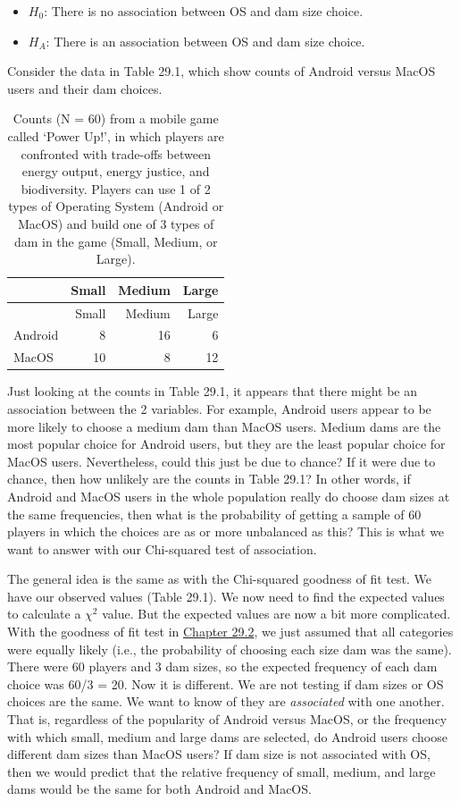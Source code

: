 \documentclass[
  openany]{scrbook}
\providecommand{\tightlist}{%
  \setlength{\itemsep}{0pt}\setlength{\parskip}{0pt}}
\begin{document}
\begin{itemize}
\tightlist
\item
  \(H_{0}\): There is no association between OS and dam size choice.
\item
  \(H_{A}\): There is an association between OS and dam size choice.
\end{itemize}

Consider the data in Table 29.1, which show counts of Android versus MacOS users and their dam choices.

\begin{longtable}[]{@{}lrrr@{}}
\caption{\label{tab:unnamed-chunk-120}Counts (N = 60) from a mobile game called `Power Up!', in which players are confronted with trade-offs between energy output, energy justice, and biodiversity. Players can use 1 of 2 types of Operating System (Android or MacOS) and build one of 3 types of dam in the game (Small, Medium, or Large).}\tabularnewline
\toprule
& Small & Medium & Large \\
\midrule
\endfirsthead
\toprule
& Small & Medium & Large \\
\midrule
\endhead
Android & 8 & 16 & 6 \\
MacOS & 10 & 8 & 12 \\
\bottomrule
\end{longtable}

Just looking at the counts in Table 29.1, it appears that there might be an association between the 2 variables.
For example, Android users appear to be more likely to choose a medium dam than MacOS users.
Medium dams are the most popular choice for Android users, but they are the least popular choice for MacOS users.
Nevertheless, could this just be due to chance?
If it were due to chance, then how unlikely are the counts in Table 29.1?
In other words, if Android and MacOS users in the whole population really do choose dam sizes at the same frequencies, then what is the probability of getting a sample of 60 players in which the choices are as or more unbalanced as this?
This is what we want to answer with our Chi-squared test of association.

The general idea is the same as with the Chi-squared goodness of fit test.
We have our observed values (Table 29.1).
We now need to find the expected values to calculate a \(\chi^{2}\) value.
But the expected values are now a bit more complicated.
With the goodness of fit test in \protect\hyperlink{chi-squared-goodness-of-fit}{Chapter 29.2}, we just assumed that all categories were equally likely (i.e., the probability of choosing each size dam was the same).
There were 60 players and 3 dam sizes, so the expected frequency of each dam choice was 60/3 = 20.
Now it is different.
We are not testing if dam sizes or OS choices are the same.
We want to know of they are \emph{associated} with one another.
That is, regardless of the popularity of Android versus MacOS, or the frequency with which small, medium and large dams are selected, do Android users choose different dam sizes than MacOS users?
If dam size is not associated with OS, then we would predict that the relative frequency of small, medium, and large dams would be the same for both Android and MacOS.
\end{document}
